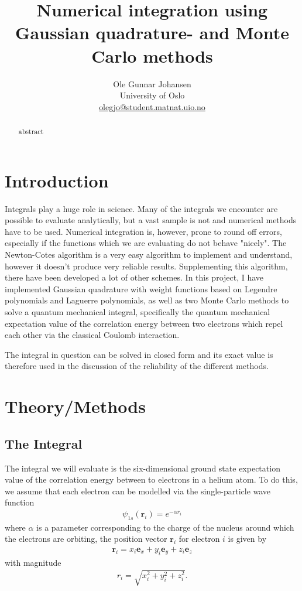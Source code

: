 \documentclass[twoside, 11pt]{article}
\title{\vspace{-15mm}\fontsize{16pt}{13pt}\selectfont\textbf{Numerical integration using Gaussian quadrature- and Monte Carlo methods}} %
\author{
\large
Ole Gunnar Johansen\\[-2mm]%
\normalsize University of Oslo \\[-2mm] %
\normalsize \href{mailto:olegjo@ulrik.uio.no}{olegjo@student.matnat.uio.no} %
\vspace{5mm}
}
\date{}
\begin{document}
\maketitle %
\thispagestyle{fancy} %


\begin{abstract}

\noindent
abstract
\end{abstract}

\begin{multicols}{2}

\section{Introduction}
	Integrals play a huge role in science. Many of the integrals we encounter are possible to evaluate analytically, but a vast sample is not and numerical methods have to be used. Numerical integration is, however, prone to round off errors, especially if the functions which we are evaluating do not behave "nicely". The Newton-Cotes algorithm is a very easy algorithm to implement and understand, however it doesn't produce very reliable results. Supplementing this algorithm, there have been developed a lot of other schemes. In this project, I have implemented Gaussian quadrature with weight functions based on Legendre polynomials and Laguerre polynomials, as well as two Monte Carlo methods to solve a quantum mechanical integral, specifically the quantum mechanical expectation value of the correlation energy between two electrons which repel each other via the classical Coulomb interaction. 
	
	The integral in question can be solved in closed form and its exact value is therefore used in the discussion of the reliability of the different methods.

\section{Theory/Methods}
	\subsection{The Integral}
		The integral we will evaluate is the six-dimensional ground state expectation value of the correlation energy between to electrons in a helium atom. To do this, we assume that each electron can be modelled via the single-particle wave function
		\begin{align}
			\psi_{1s} (\mathbf{r}_i) = e^{-\alpha r_i}
		\end{align}
		where $\alpha$ is a parameter corresponding to the charge of the nucleus around which the electrons are orbiting, the position vector $\mathbf{r}_i$ for electron $i$ is given by
		\begin{align}
			\mathbf{r}_i = x_i \mathbf{e}_x + y_i \mathbf{e}_y + z_i \mathbf{e}_z
		\end{align}
		with magnitude
		\begin{align}
			r_i = \sqrt{x_i^2 + y_i^2 + z_i^2}.
		\end{align}
		

\end{multicols}
\end{document}
